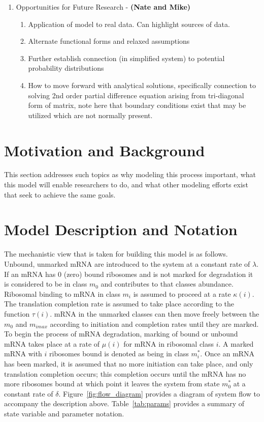 \documentclass[review]{elsarticle}
\begin{document}
\begin{enumerate}
\begin{enumerate}
\end{enumerate}
\item Opportunities for Future Research  - \textbf{(Nate and Mike)}
\begin{enumerate}
\item Application of model to real data.  Can highlight sources of data.
\item Alternate functional forms and relaxed assumptions
\item Further establish connection (in simplified system) to potential probability distributions
\item How to move forward with analytical solutions, specifically connection to solving 2nd order partial difference equation arising from tri-diagonal form of matrix, note here that boundary conditions exist that may be utilized which are not normally present.
\end{enumerate}
\end{enumerate}
\newpage
\section{Motivation and Background}
This section addresses such topics as why modeling this process important, what this model will enable researchers to do, and what other modeling efforts exist that seek to achieve the same goals.

\section{Model Description and Notation}\label{sec:description}
The mechanistic view that is taken for building this model is as follows.  Unbound, unmarked mRNA are introduced to the system at a constant rate of $\lambda$.  If an mRNA has 0 (zero) bound ribosomes and is not marked for degradation it is considered to be in class $m_0$ and contributes to that classes abundance.  Ribosomal binding to mRNA in class $m_i$ is assumed to proceed at a rate $\kappa(i)$.  The translation completion rate is assumed to take place according to the function $\tau(i)$.  mRNA in the unmarked classes can then move freely between the $m_0$ and $m_{imax}$ according to initiation and completion rates until they are marked.  To begin the process of mRNA degradation, marking of bound or unbound mRNA takes place at a rate of $\mu(i)$ for mRNA in ribosomal class $i$.  A marked mRNA with $i$ ribosomes bound is denoted as being in class $m_i^*$.  Once an mRNA has been marked, it is assumed that no more initiation can take place, and only translation completion occurs; this completion occurs until the mRNA has no more ribosomes bound at which point it leaves the system from state $m_0^*$ at a constant rate of $\delta$.  Figure~\ref{fig:flow_diagram} provides a diagram of system flow to accompany the description above.  Table~\ref{tab:params} provides a summary of state variable and parameter notation.
\end{document}
